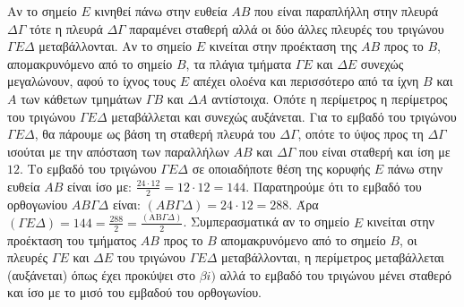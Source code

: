 \begin{alist}
\begin{rlist}
\begin{figure}
\end{figure}
Αν το σημείο $E$ κινηθεί πάνω στην ευθεία $AB$ που είναι παραπλήλλη στην πλευρά $\Delta\Gamma$ τότε η πλευρά $\Delta\Gamma$ παραμένει σταθερή αλλά οι δύο άλλες πλευρές του τριγώνου $\Gamma E\Delta$ μεταβάλλονται. Αν το σημείο $E$ κινείται στην προέκταση της $AB$ προς το $B$, απομακρυνόμενο από το σημείο $B$, τα πλάγια τμήματα $\Gamma E$ και $\Delta E$ συνεχώς μεγαλώνουν, αφού το ίχνος τους $E$ απέχει ολοένα και περισσότερο από τα ίχνη $B$ και $A$ των κάθετων τμημάτων $\Gamma B$ και $\Delta A$ αντίστοιχα. Οπότε η περίμετρος η περίμετρος του τριγώνου $\Gamma E\Delta$ μεταβάλλεται και συνεχώς αυξάνεται.
Για το εμβαδό του τριγώνου $\Gamma E\Delta$, θα πάρουμε ως βάση τη σταθερή πλευρά του $\Delta\Gamma$, οπότε το ύψος προς τη $\Delta\Gamma$ ισούται με την απόσταση των παραλλήλων $AB$ και $\Delta\Gamma$ που είναι σταθερή και ίση με $12$. Το εμβαδό του τριγώνου $\Gamma E\Delta$ σε οποιαδήποτε θέση της κορυφής $E$ πάνω στην ευθεία $AB$ είναι ίσο με: $\frac{24 \cdot 12}{2} = 12 \cdot 12 = 144$.
Παρατηρούμε ότι το εμβαδό του ορθογωνίου $AB\Gamma\Delta$ είναι: $(AB\Gamma\Delta) = 24 \cdot 12 = 288$.
Άρα $(\Gamma E\Delta) = 144 = \frac{288}{2} = \frac{(\text{AB}\Gamma\Delta)}{2}$.
Συμπερασματικά αν το σημείο $E$ κινείται στην προέκταση του τμήματος $AB$ προς το $B$ απομακρυνόμενο από το σημείο $B$, οι πλευρές $\Gamma E$ και $\Delta E$ του τριγώνου $\Gamma E\Delta$ μεταβάλλονται, η περίμετρος μεταβάλλεται (αυξάνεται) όπως έχει προκύψει στο $\beta i)$ αλλά το εμβαδό του τριγώνου μένει σταθερό και ίσο με το μισό του εμβαδού του ορθογωνίου.
\end{rlist}
\end{alist}
